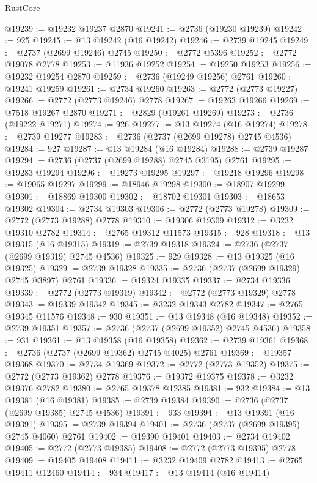 \begin{lexlean}{RustCore}
\begin{coremodule}
@19239 := @19232 @19237 @2870
@19241 := @2736 (@19230 @19239)
@19242 := 925
@19245 := @13 @19242 (@16 @19242)
@19246 := @2739 @19245
@19249 := @2737 (@2699 @19246) @2745
@19250 := @2772 @5396
@19252 := @2772 @19078 @2778
@19253 := @11936 @19252
@19254 := @19250 @19253
@19256 := @19232 @19254 @2870
@19259 := @2736 (@19249 @19256) @2761
@19260 := @19241 @19259
@19261 := @2734 @19260
@19263 := @2772 (@2773 @19227)
@19266 := @2772 (@2773 @19246) @2778
@19267 := @19263 @19266
@19269 := @7518 @19267 @2870
@19271 := @2829 (@19261 @19269)
@19273 := @2736 (@19222 @19271)
@19274 := 926
@19277 := @13 @19274 (@16 @19274)
@19278 := @2739 @19277
@19283 := @2736 (@2737 (@2699 @19278) @2745 @4536)
@19284 := 927
@19287 := @13 @19284 (@16 @19284)
@19288 := @2739 @19287
@19294 := @2736 (@2737 (@2699 @19288) @2745 @3195) @2761
@19295 := @19283 @19294
@19296 := @19273 @19295
@19297 := @19218 @19296
@19298 := @19065 @19297
@19299 := @18946 @19298
@19300 := @18907 @19299
@19301 := @18869 @19300
@19302 := @18702 @19301
@19303 := @18653 @19302
@19304 := @2734 @19303
@19306 := @2772 (@2773 @19278)
@19309 := @2772 (@2773 @19288) @2778
@19310 := @19306 @19309
@19312 := @3232 @19310 @2782
@19314 := @2765 @19312 @11573
@19315 := 928
@19318 := @13 @19315 (@16 @19315)
@19319 := @2739 @19318
@19324 := @2736 (@2737 (@2699 @19319) @2745 @4536)
@19325 := 929
@19328 := @13 @19325 (@16 @19325)
@19329 := @2739 @19328
@19335 := @2736 (@2737 (@2699 @19329) @2745 @3897) @2761
@19336 := @19324 @19335
@19337 := @2734 @19336
@19339 := @2772 (@2773 @19319)
@19342 := @2772 (@2773 @19329) @2778
@19343 := @19339 @19342
@19345 := @3232 @19343 @2782
@19347 := @2765 @19345 @11576
@19348 := 930
@19351 := @13 @19348 (@16 @19348)
@19352 := @2739 @19351
@19357 := @2736 (@2737 (@2699 @19352) @2745 @4536)
@19358 := 931
@19361 := @13 @19358 (@16 @19358)
@19362 := @2739 @19361
@19368 := @2736 (@2737 (@2699 @19362) @2745 @4025) @2761
@19369 := @19357 @19368
@19370 := @2734 @19369
@19372 := @2772 (@2773 @19352)
@19375 := @2772 (@2773 @19362) @2778
@19376 := @19372 @19375
@19378 := @3232 @19376 @2782
@19380 := @2765 @19378 @12385
@19381 := 932
@19384 := @13 @19381 (@16 @19381)
@19385 := @2739 @19384
@19390 := @2736 (@2737 (@2699 @19385) @2745 @4536)
@19391 := 933
@19394 := @13 @19391 (@16 @19391)
@19395 := @2739 @19394
@19401 := @2736 (@2737 (@2699 @19395) @2745 @4060) @2761
@19402 := @19390 @19401
@19403 := @2734 @19402
@19405 := @2772 (@2773 @19385)
@19408 := @2772 (@2773 @19395) @2778
@19409 := @19405 @19408
@19411 := @3232 @19409 @2782
@19413 := @2765 @19411 @12460
@19414 := 934
@19417 := @13 @19414 (@16 @19414)

\end{coremodule}
\end{lexlean}
